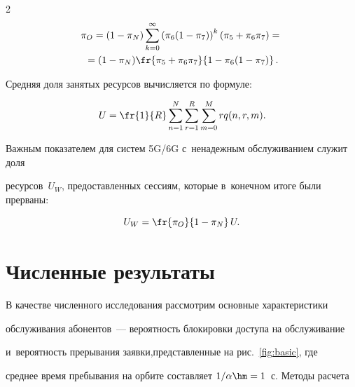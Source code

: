 \begin{multicols}{2}
\begin{multline*}
    \pi_O= (1  - \pi_N) \sum\limits_{k=0}^{\infty} \left( 

\pi_6 (1-\pi_7)\right)^k (\pi_5 + \pi_6 \pi_7) = {}\\

{}=(1-\pi_N) \fr{\pi_5 + \pi_6 

\pi_7}{1-\pi_6(1-\pi_7)}\,.

\end{multline*}



Средняя доля занятых ресурсов вы\-чис\-ля\-ет\-ся по фор\-муле:

\begin{equation*} 


U=\fr{1}{R} \sum\limits_{n=1}^N \sum\limits_{r=1}^R \sum\limits_{m=0}^M r q(n,r,m).

\end{equation*}



Важным показателем для систем 5G/6G с~ненадежным обслуживанием служит доля 

ресурсов~$U_W$, пред\-остав\-лен\-ных сессиям, которые в~конечном итоге были прерваны:

\begin{equation*} 


U_W=\fr{\pi_O}{1-\pi_N}\, U.

\end{equation*}





\section{Численные результаты}








В качестве численного исследования рас\-смот\-рим основные характеристики 

обслуживания абонентов~--- ве\-ро\-ят\-ность блокировки до\-сту\-па на обслуживание 

и~ве\-ро\-ят\-ность прерывания заявки,\linebreak пред\-став\-лен\-ные на рис.~\ref{fig:basic}, где 

сред\-нее время пребывания на орбите со\-став\-ля\-ет $1/\alpha\hm=1$~с. \mbox{Методы} расчета 


\end{multicols}
